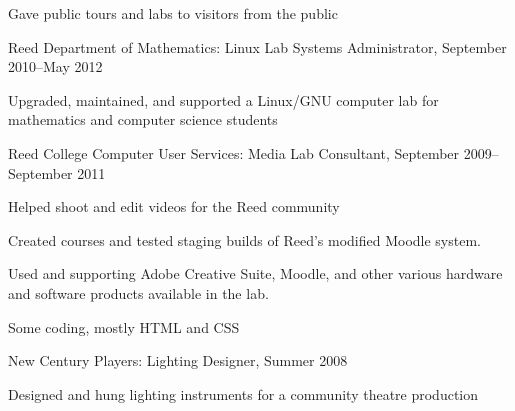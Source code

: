 \documentclass[letterpaper]{article}
\renewenvironment{itemize}{\begin{list}{}{\setlength{\leftmargin}{1.5em}}}{\end{list}}%
\begin{document}
\begin{itemize}
\begin{itemize}
	\item Gave public tours and labs to visitors from the public
	\end{itemize}
\item Reed Department of Mathematics: Linux Lab Systems Administrator, September 2010--May 2012
	\begin{itemize}
	\item Upgraded, maintained, and supported a Linux/GNU computer lab for mathematics and computer science students
	\end{itemize}
\item Reed College Computer User Services: Media Lab Consultant, September 2009--September 2011
	\begin{itemize}
	\item Helped shoot and edit videos for the Reed community
	\item Created courses and tested staging builds of Reed's modified Moodle system. 
	\item Used and supporting Adobe Creative Suite, Moodle, and other various hardware and software products available in the lab.
	\item Some coding, mostly HTML and CSS
	\end{itemize}
\item New Century Players: Lighting Designer, Summer 2008
	\begin{itemize}
	\item Designed and hung lighting instruments for a community theatre production
	\end{itemize}
\end{itemize}




\end{document}
